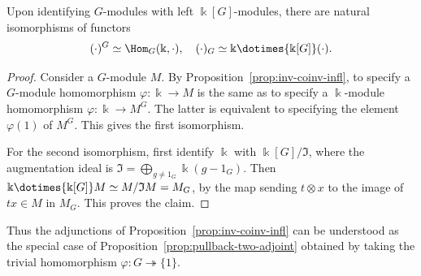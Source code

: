 \begin{proposition}\label{prop:inv-coinv-Hom}
	Upon identifying $G$-modules with left $\Bbbk[G]$-modules, there are natural
	isomorphisms of functors
	\begin{gather*}
		(\cdot)^G \simeq \Hom_G(\Bbbk, \cdot), \quad  (\cdot)_G \simeq \Bbbk \dotimes{\Bbbk[G]} (\cdot).
	\end{gather*}
\end{proposition}
\begin{proof}
	Consider a $G$-module $M$. By Proposition~\ref{prop:inv-coinv-infl}, to
	specify a $G$-module homomorphism $\varphi:\Bbbk\to M$ is the same as to
	specify a $\Bbbk$-module homomorphism $\varphi:\Bbbk\to M^G$. The latter
	is equivalent to specifying the element $\varphi(1)$ of $M^G$. This gives
	the first isomorphism.

	For the second isomorphism, first identify $\Bbbk$ with
	$\Bbbk[G]/\mathfrak{I}$, where the augmentation ideal is
	$\mathfrak{I}=\bigoplus_{g\neq1_G}\Bbbk(g-1_G)$. Then
	$\Bbbk\dotimes{\Bbbk[G]}M\simeq M/\mathfrak{I}M=M_G$, by the map sending
	$t\otimes x$ to the image of $tx\in M$ in $M_G$. This proves the claim.
\end{proof}

Thus the adjunctions of Proposition~\ref{prop:inv-coinv-infl} can be understood
as the special case of Proposition~\ref{prop:pullback-two-adjoint} obtained by
taking the trivial homomorphism $\varphi:G\twoheadrightarrow\{1\}$.

